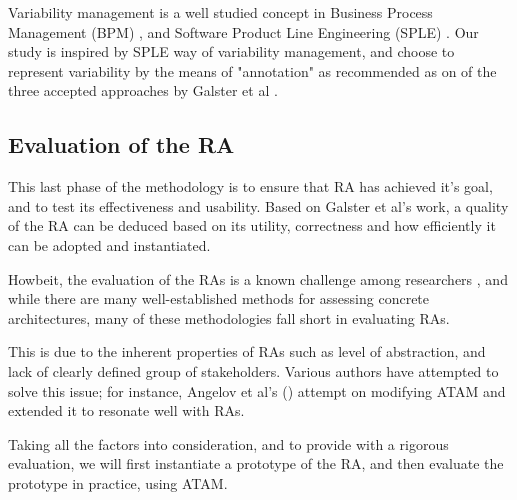 \documentclass[runningheads]{llncs}
\begin{document}

Variability management is a well studied concept in Business Process Management (BPM) \cite{la2009questionnaire}, and Software Product Line Engineering (SPLE) \cite{pohl2005software}. Our study is inspired by SPLE way of variability management, and choose to represent variability by the means of "annotation" as recommended as on of the three accepted approaches by Galster et al \cite{GALSTER}.


\subsection{Evaluation of the RA}

This last phase of the methodology is to ensure that RA has achieved it's goal, and to test its effectiveness and usability. Based on Galster et al's work, a quality of the RA can be deduced based on its utility, correctness and how efficiently it can be adopted and instantiated.  

Howbeit, the evaluation of the RAs is a known challenge among researchers \cite{angelov2008contracting} \cite{Avgeriou} \cite{Cioroaica} \cite{Maier}, and while there are many well-established methods for assessing concrete architectures, many of these methodologies fall short in evaluating RAs. 

This is due to the inherent properties of RAs such as level of abstraction, and lack of clearly defined group of stakeholders. Various authors have attempted to solve this issue; for instance, Angelov et al's (\cite{angelov2008towards}) attempt on modifying ATAM and extended it to resonate well with RAs. 



Taking all the factors into consideration, and to provide with a rigorous evaluation, we will first instantiate a prototype of the RA, and then evaluate the prototype in practice, using ATAM. 
\end{document}
